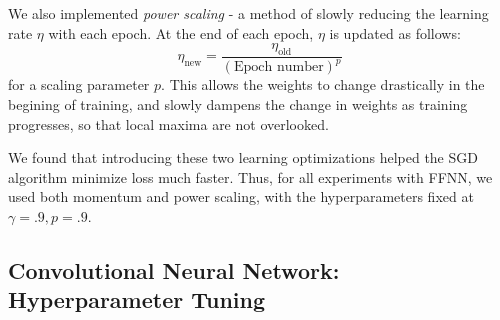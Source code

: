 \documentclass[letterpaper, 10 pt, conference]{ieeeconf}
\begin{document}
We also implemented \emph{power scaling} - a method of slowly reducing the learning rate $\eta$ with each epoch. At the end of each epoch, $\eta$ is updated as follows:
$$
\eta_{\text{new}} = \frac{\eta_{\text{old}}}{(\text{Epoch number})^{p}}
$$
for a scaling parameter $p$. This allows the weights to change drastically in the begining of training, and slowly dampens the change in weights as training progresses, so that local maxima are not overlooked. 

We found that introducing these two learning optimizations helped the SGD algorithm minimize loss much faster. Thus, for all experiments with FFNN, we used both momentum and power scaling, with the hyperparameters fixed at $\gamma = .9, p = .9$. 

\subsection{Convolutional Neural Network: Hyperparameter Tuning} 
\end{document}
